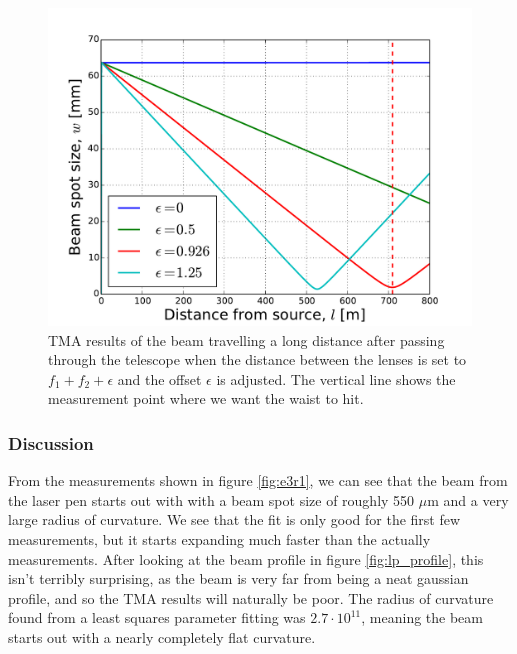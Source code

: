 \documentclass[a4paper, 11pt, notitlepage, english]{article}
\newcommand{\eps}{\epsilon}
\begin{document}
\begin{figure}[p]
\centering
\includegraphics[width=\textwidth]{e3p3}  
\caption{TMA results of the beam travelling a long distance after passing through the telescope when the distance between the lenses is set to $f_1+f_2+\eps$ and the offset $\eps$ is adjusted. The vertical line shows the measurement point where we want the waist to hit. \label{fig:e3r3}}
\end{figure}

\clearpage

\subsubsection{Discussion}

From the measurements shown in figure \ref{fig:e3r1}, we can see that the beam from the laser pen starts out with with a beam spot size of roughly 550 $\mu$m and a very large radius of curvature. We see that the fit is only good for the first few measurements, but it starts expanding much faster than the actually measurements. After looking at the beam profile in figure \ref{fig:lp_profile}, this isn't terribly surprising, as the beam is very far from being a neat gaussian profile, and so the TMA results will naturally be poor. The radius of curvature found from a least squares parameter fitting was $2.7\cdot10^{11}$, meaning the beam starts out with a nearly completely flat curvature.
\end{document}
